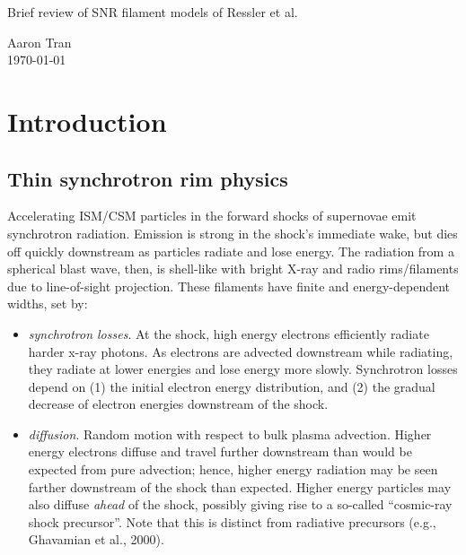 \documentclass[10pt]{article}
\begin{document}
\begin{center}
    \Large{Brief review of SNR filament models of Ressler et al.}

    \normalsize{Aaron Tran}\\
    \today \\
\end{center}

\tableofcontents

\section{Introduction}

\subsection{Thin synchrotron rim physics}

Accelerating ISM/CSM particles in the forward shocks of supernovae emit
synchrotron radiation.  Emission is strong in the shock's immediate wake, but
dies off quickly downstream as particles radiate and lose energy. The radiation
from a spherical blast wave, then, is shell-like with bright X-ray and radio
rims/filaments due to line-of-sight projection.  These filaments have finite
and energy-dependent widths, set by:
\begin{itemize}
  \item \emph{synchrotron losses}.  At the shock, high energy electrons
  efficiently radiate harder x-ray photons.  As electrons are advected
  downstream while radiating, they radiate at lower energies and lose energy
  more slowly.  Synchrotron losses depend on (1) the initial electron energy
  distribution, and (2) the gradual decrease of electron energies downstream of
  the shock.
  \item \emph{diffusion}.  Random motion with respect to bulk plasma advection.
  Higher energy electrons diffuse and travel further downstream than would be
  expected from pure advection; hence, higher energy radiation may be seen
  farther downstream of the shock than expected.
  Higher energy particles may also diffuse \emph{ahead} of the shock, possibly
  giving rise to a so-called ``cosmic-ray shock precursor''.  Note that this is
  distinct from radiative precursors (e.g., Ghavamian et al., 2000).
\end{itemize}
\end{document}
